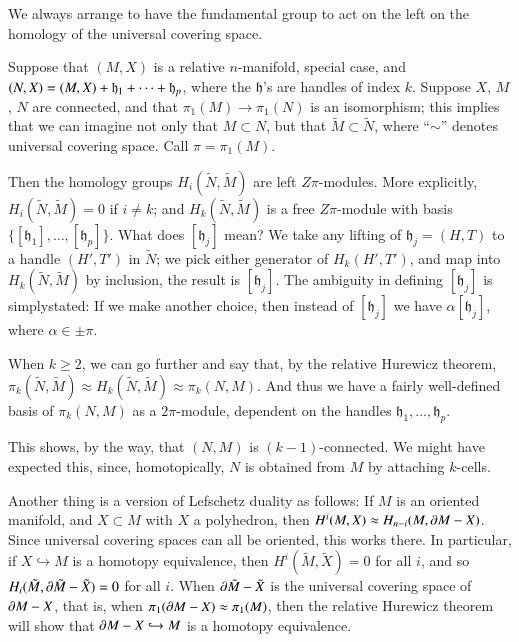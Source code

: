 We always arrange to have the fundamental group to act on the left on the homology of the universal covering space.

Suppose that $(M,X)$ is a relative $n$-manifold, special case, and
$(N,\break X)=(M,X)+\mathfrak{h}_{1}+\cdots+\mathfrak{h}_{p}$, where the $\mathfrak{h}$'s are handles of index $k$. Suppose $X$, $M$, $N$ are connected, and that $\pi_{1}(M)\to \pi_{1}(N)$ is an isomorphism; this implies that we can imagine not only that $M\subset N$, but that $\tilde{M}\subset \tilde{N}$, where ``$\sim$'' denotes universal covering space. Call $\pi=\pi_{1}(M)$.

Then the homology groups $H_{i}(\tilde{N},\tilde{M})$ are left $Z\pi$-modules. More explicitly, $H_{i}(\tilde{N},\tilde{M})=0$ if $i\neq k$; and $H_{k}(\tilde{N},\tilde{M})$ is a free $Z\pi$-module with basis $\{[\mathfrak{h}_{1}],\ldots,[\mathfrak{h}_{p}]\}$. What does $[\mathfrak{h}_{j}]$ mean? We take any lifting of $\mathfrak{h}_{j}=(H,T)$ to a handle $(H',T')$ in $\tilde{N}$; we pick either generator of $H_{k}(H',T')$, and map into $H_{k}(\tilde{N},\tilde{M})$ by inclusion, the result is $[\mathfrak{h}_{j}]$. The ambiguity in defining $[\mathfrak{h}_{j}]$ is simply\pageoriginale stated: If we make another choice, then instead of $[\mathfrak{h}_{j}]$ we have $\alpha[\mathfrak{h}_{j}]$, where $\alpha\in \pm \pi$.

When $k\geq 2$, we can go further and say that, by the relative Hurewicz theorem, $\pi_{k}(\tilde{N},\tilde{M})\approx H_{k}(\tilde{N},\tilde{M})\approx \pi_{k}(N,M)$. And thus we have a fairly well-defined basis of $\pi_{k}(N,M)$ as a $2\pi$-module, dependent on the handles $\mathfrak{h}_{1},\ldots,\mathfrak{h}_{p}$.

This shows, by the way, that $(N,M)$ is $(k-1)$-connected. We might have expected this, since, homotopically, $N$ is obtained from $M$ by attaching $k$-cells.

Another thing is a version of Lefschetz duality as follows: If $M$ is an oriented manifold, and $X\subset M$ with $X$ a polyhedron, then $H^{i}(M,X)\approx H_{n-i}(M,\partial M-X)$. Since universal covering spaces can all be oriented, this works there. In particular, if $X\hookrightarrow M$ is a homotopy equivalence, then $H^{i}(\tilde{M},\tilde{X})=0$ for all $i$, and so $H_{i}(\tilde{M},\partial \tilde{M}-\tilde{X})=0$ for all $i$. When $\partial \tilde{M}-\tilde{X}$ is the universal covering space of $\partial M-X$, that is, when $\pi_{1}(\partial M-X)\approx \pi_{1}(M)$, then the relative Hurewicz theorem will show that $\partial M-X\hookrightarrow M$ is a homotopy 
equivalence.

